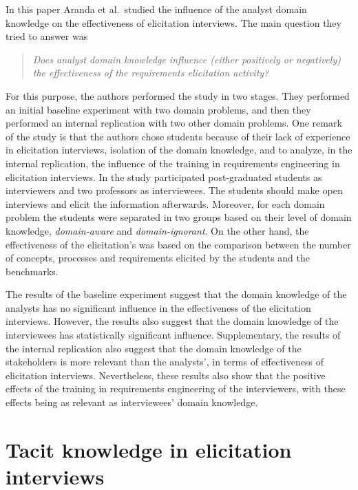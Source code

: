 \documentclass[]{llncs}
\begin{document}
In this paper Aranda et al.~studied the influence of the analyst domain
knowledge on the effectiveness of elicitation interviews. The main
question they tried to answer was

\begin{quote}
\emph{Does analyst domain knowledge influence (either positively or
negatively) the effectiveness of the requirements elicitation activity?}
\end{quote}

For this purpose, the authors performed the study in two stages. They
performed an initial baseline experiment with two domain problems, and
then they performed an internal replication with two other domain
problems. One remark of the study is that the authors chose students
because of their lack of experience in elicitation interviews, isolation
of the domain knowledge, and to analyze, in the internal replication,
the influence of the training in requirements engineering in elicitation
interviews. In the study participated post-graduated students as
interviewers and two professors as interviewees. The students should
make open interviews and elicit the information afterwards. Moreover,
for each domain problem the students were separated in two groups based
on their level of domain knowledge, \emph{domain-aware} and
\emph{domain-ignorant}. On the other hand, the effectiveness of the
elicitation's was based on the comparison between the number of
concepts, processes and requirements elicited by the students and the
benchmarks.

The results of the baseline experiment suggest that the domain knowledge
of the analysts has no significant influence in the effectiveness of the
elicitation interviews. However, the results also suggest that the
domain knowledge of the interviewees has statistically significant
influence. Supplementary, the results of the internal replication also
suggest that the domain knowledge of the stakeholders is more relevant
than the analysts', in terms of effectiveness of elicitation interviews.
Nevertheless, these results also show that the positive effects of the
training in requirements engineering of the interviewers, with these
effects being as relevant as interviewees' domain knowledge.

\hypertarget{tacit-knowledge-in-elicitation-interviews}{%
\section{Tacit knowledge in elicitation
interviews}\label{tacit-knowledge-in-elicitation-interviews}}
\end{document}
